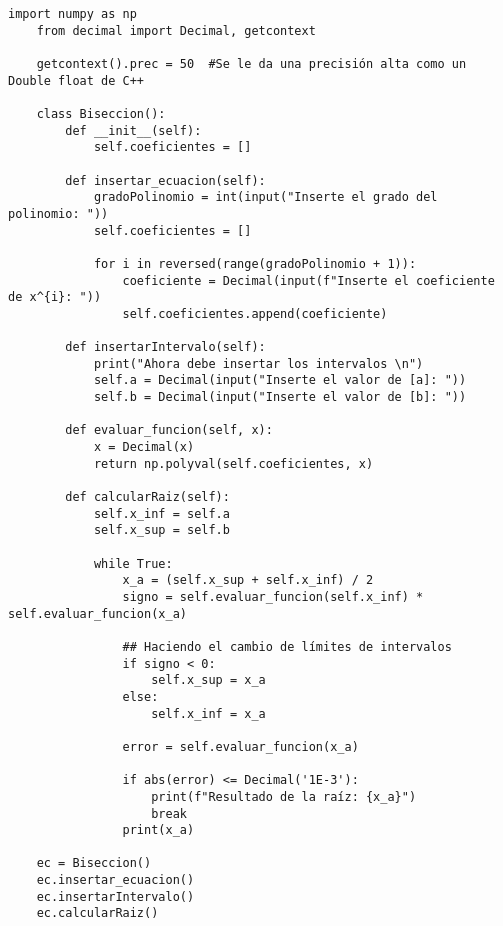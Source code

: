\begin{lstlisting}[style=jupyter]
    import numpy as np
    from decimal import Decimal, getcontext
    
    getcontext().prec = 50  #Se le da una precisión alta como un Double float de C++
    
    class Biseccion():
        def __init__(self):
            self.coeficientes = []
    
        def insertar_ecuacion(self):
            gradoPolinomio = int(input("Inserte el grado del polinomio: "))
            self.coeficientes = []
    
            for i in reversed(range(gradoPolinomio + 1)):
                coeficiente = Decimal(input(f"Inserte el coeficiente de x^{i}: "))
                self.coeficientes.append(coeficiente)
        
        def insertarIntervalo(self):
            print("Ahora debe insertar los intervalos \n")
            self.a = Decimal(input("Inserte el valor de [a]: "))
            self.b = Decimal(input("Inserte el valor de [b]: "))
    
        def evaluar_funcion(self, x):
            x = Decimal(x)
            return np.polyval(self.coeficientes, x)
        
        def calcularRaiz(self):
            self.x_inf = self.a
            self.x_sup = self.b
    
            while True:
                x_a = (self.x_sup + self.x_inf) / 2
                signo = self.evaluar_funcion(self.x_inf) * self.evaluar_funcion(x_a)
    
                ## Haciendo el cambio de límites de intervalos
                if signo < 0:
                    self.x_sup = x_a
                else:
                    self.x_inf = x_a
    
                error = self.evaluar_funcion(x_a)
    
                if abs(error) <= Decimal('1E-3'):
                    print(f"Resultado de la raíz: {x_a}")
                    break
                print(x_a)
    
    ec = Biseccion()
    ec.insertar_ecuacion()
    ec.insertarIntervalo()
    ec.calcularRaiz()
\end{lstlisting}

